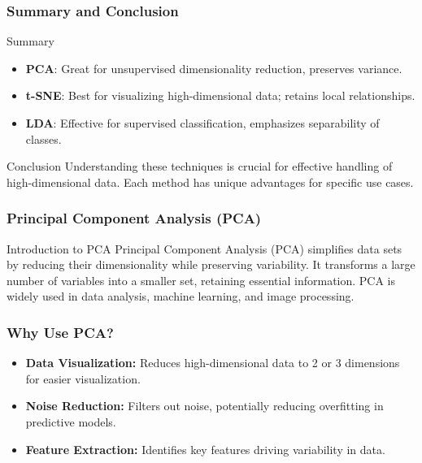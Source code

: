 \documentclass[aspectratio=169]{beamer}
\begin{document}
\begin{frame}[fragile]
    \frametitle{Summary and Conclusion}
    \begin{block}{Summary}
        \begin{itemize}
            \item \textbf{PCA}: Great for unsupervised dimensionality reduction, preserves variance.
            \item \textbf{t-SNE}: Best for visualizing high-dimensional data; retains local relationships.
            \item \textbf{LDA}: Effective for supervised classification, emphasizes separability of classes.
        \end{itemize}
    \end{block}
    \begin{block}{Conclusion}
        Understanding these techniques is crucial for effective handling of high-dimensional data. Each method has unique advantages for specific use cases.
    \end{block}
\end{frame}

\begin{frame}[fragile]
    \frametitle{Principal Component Analysis (PCA)}
    \begin{block}{Introduction to PCA}
        Principal Component Analysis (PCA) simplifies data sets by reducing their dimensionality while preserving variability. It transforms a large number of variables into a smaller set, retaining essential information. PCA is widely used in data analysis, machine learning, and image processing.
    \end{block}
\end{frame}

\begin{frame}[fragile]
    \frametitle{Why Use PCA?}
    \begin{itemize}
        \item \textbf{Data Visualization:} Reduces high-dimensional data to 2 or 3 dimensions for easier visualization.
        \item \textbf{Noise Reduction:} Filters out noise, potentially reducing overfitting in predictive models.
        \item \textbf{Feature Extraction:} Identifies key features driving variability in data.
    \end{itemize}
\end{frame}
\end{document}
